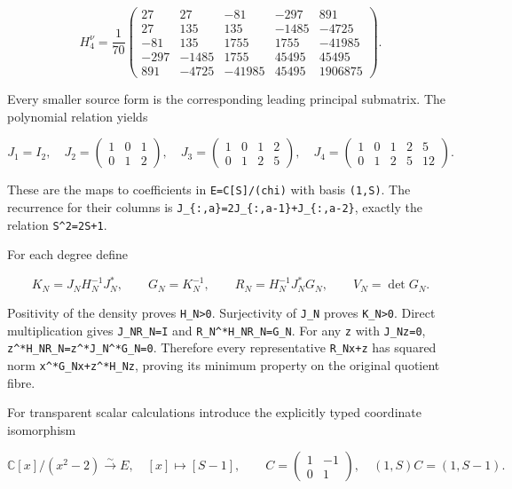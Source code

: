 \[
H_4^\nu=\frac1{70}
\begin{pmatrix}
27&27&-81&-297&891\\
27&135&135&-1485&-4725\\
-81&135&1755&1755&-41985\\
-297&-1485&1755&45495&45495\\
891&-4725&-41985&45495&1906875
\end{pmatrix}.
\tag{F.9}
\]

Every smaller source form is the corresponding leading principal submatrix. The polynomial relation yields

\[
J_1=I_2,\quad
J_2=\begin{pmatrix}1&0&1\\0&1&2\end{pmatrix},\quad
J_3=\begin{pmatrix}1&0&1&2\\0&1&2&5\end{pmatrix},\quad
J_4=\begin{pmatrix}1&0&1&2&5\\0&1&2&5&12\end{pmatrix}.
\tag{F.10}
\]

These are the maps to coefficients in \texttt{E=C{[}S{]}/(chi)} with basis \nolinkurl{(1,S)}. The recurrence for their columns is \texttt{J\_\{:,a\}=2J\_\{:,a-1\}+J\_\{:,a-2\}}, exactly the relation \texttt{S\^{}2=2S+1}.

For each degree define

\[
K_N=J_NH_N^{-1}J_N^*,\qquad G_N=K_N^{-1},
\qquad R_N=H_N^{-1}J_N^*G_N,\qquad V_N=\det G_N.
\tag{F.11}
\]

Positivity of the density proves \texttt{H\_N\textgreater{}0}. Surjectivity of \nolinkurl{J_N} proves \texttt{K\_N\textgreater{}0}. Direct multiplication gives \nolinkurl{J_NR_N=I} and \texttt{R\_N\^{}*H\_NR\_N=G\_N}. For any \nolinkurl{z} with \nolinkurl{J_Nz=0}, \texttt{z\^{}*H\_NR\_N=z\^{}*J\_N\^{}*G\_N=0}. Therefore every representative \nolinkurl{R_Nx+z} has squared norm \texttt{x\^{}*G\_Nx+z\^{}*H\_Nz}, proving its minimum property on the original quotient fibre.

For transparent scalar calculations introduce the explicitly typed coordinate isomorphism

\[
\mathbb C[x]/(x^2-2)\xrightarrow{\sim}E,
\quad[x]\longmapsto[S-1],\qquad
C=\begin{pmatrix}1&-1\\0&1\end{pmatrix},
\quad (1,S)C=(1,S-1).
\tag{F.12}
\]

